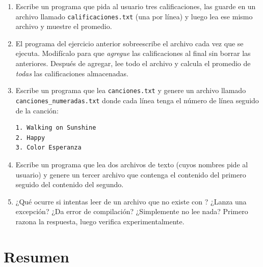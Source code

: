 \documentclass[12pt, oneside]{article}
\begin{document}
\begin{enumerate}

  \item Escribe un programa que pida al usuario tres calificaciones, las
        guarde en un archivo llamado \texttt{calificaciones.txt} (una por
        línea) y luego lea ese mismo archivo y muestre el promedio.

  \item El programa del ejercicio anterior sobreescribe el archivo cada
        vez que se ejecuta.  Modifícalo para que \textit{agregue} las
        calificaciones al final sin borrar las anteriores.  Después de
        agregar, lee todo el archivo y calcula el promedio de
        \textit{todas} las calificaciones almacenadas.

  \item Escribe un programa que lea \texttt{canciones.txt} y genere un
        archivo llamado \texttt{canciones\_numeradas.txt} donde cada
        línea tenga el número de línea seguido de la canción:
        \begin{verbatim}
1. Walking on Sunshine
2. Happy
3. Color Esperanza
        \end{verbatim}

  \item Escribe un programa que lea dos archivos de texto (cuyos nombres
        pide al usuario) y genere un tercer archivo que contenga el
        contenido del primero seguido del contenido del segundo.

  \item ¿Qué ocurre si intentas leer de un archivo que no existe con
        ?  ¿Lanza una excepción?  ¿Da error de compilación?
        ¿Simplemente no lee nada?  Primero razona la respuesta, luego
        verifica experimentalmente.

\end{enumerate}

\section*{Resumen}
\end{document}
